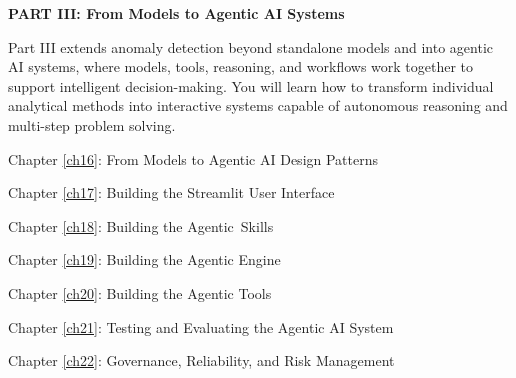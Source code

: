 \newpage

\vspace*{\fill}


\Large
\noindent\textbf{PART III: From Models to Agentic AI Systems}
\normalsize
\vspace*{3cm}


Part III extends anomaly detection beyond standalone models and into agentic AI systems, where models, tools, reasoning, and workflows work together to support intelligent decision-making. You will learn how to transform individual analytical methods into interactive systems capable of autonomous reasoning and multi-step problem solving.

\vspace*{0.5cm}

Chapter \ref{ch16}: From Models to Agentic AI Design Patterns

Chapter \ref{ch17}: Building the Streamlit User Interface

Chapter \ref{ch18}: Building the Agentic Skills

Chapter \ref{ch19}: Building the Agentic Engine

Chapter \ref{ch20}: Building the Agentic Tools

Chapter \ref{ch21}: Testing and Evaluating the Agentic AI System

Chapter \ref{ch22}: Governance, Reliability, and Risk Management

\vspace*{\fill}


